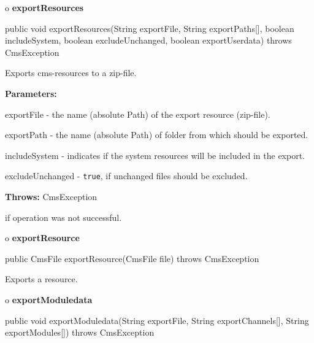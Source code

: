 o {\bf exportResources} 

\begin{PRE}
 public void exportResources(String exportFile,
                             String exportPaths[],
                             boolean includeSystem,
                             boolean excludeUnchanged,
                             boolean exportUserdata) throws CmsException
\end{PRE}

\begin{description}
\htmlDD Exports cms-resources to a zip-file. 

\begin{description}
\item {\bf Parameters:}  

exportFile - the name (absolute Path) of the export resource (zip-file).  

exportPath - the name (absolute Path) of folder from which should be exported.
 

includeSystem - indicates if the system resources will be included in the
export.  

excludeUnchanged - {\tt true}, if unchanged files should be excluded.  
\item {\bf Throws:} CmsException  

if operation was not successful.  
\end{description}

\end{description}

o {\bf exportResource} 

\begin{PRE}
 public CmsFile exportResource(CmsFile file) throws CmsException
\end{PRE}

\begin{description}
\htmlDD Exports a resource. 

\end{description}

o {\bf exportModuledata} 

\begin{PRE}
 public void exportModuledata(String exportFile,
                              String exportChannels[],
                              String exportModules[]) throws CmsException
\end{PRE}


